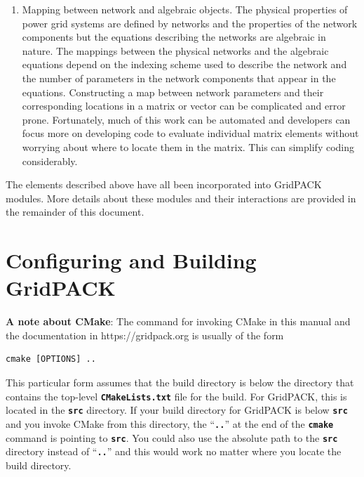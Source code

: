 \documentclass[12pt]{report} %
\begin{document}
\begin{enumerate}
\item  Mapping between network and algebraic objects. The physical properties of power grid systems are defined by networks and the properties of the network components but the equations describing the networks are algebraic in nature. The mappings between the physical networks and the algebraic equations depend on the indexing scheme used to describe the network and the number of parameters in the network components that appear in the equations. Constructing a map between network parameters and their corresponding locations in a matrix or vector can be complicated and error prone. Fortunately, much of this work can be automated and developers can focus more on developing code to evaluate individual matrix elements without worrying about where to locate them in the matrix. This can simplify coding considerably.
\end{enumerate}

The elements described above have all been incorporated into GridPACK modules. More details about these modules and their interactions are provided in the remainder of this document.

\chapter{Configuring and Building GridPACK}

\textbf{A note about CMake}: The command for invoking CMake in this manual and the documentation in https://gridpack.org is usually of the form

{
\color{red}
\begin{Verbatim}[fontseries=b]
       cmake [OPTIONS] ..
\end{Verbatim}
}

This particular form assumes that the build directory is below the directory that contains the top-level \texttt{\textbf{CMakeLists.txt}} file for the build. For GridPACK, this is located in the \texttt{\textbf{src}} directory. If your build directory for GridPACK is below \texttt{\textbf{src}} and you invoke CMake from this directory, the ``\texttt{\textbf{..}}'' at the end of the \texttt{\textbf{cmake}} command is pointing to \texttt{\textbf{src}}. You could also use the absolute path to the \texttt{\textbf{src}} directory instead of ``\texttt{\textbf{..}}'' and this would work no matter where you locate the build directory.
\end{document}
